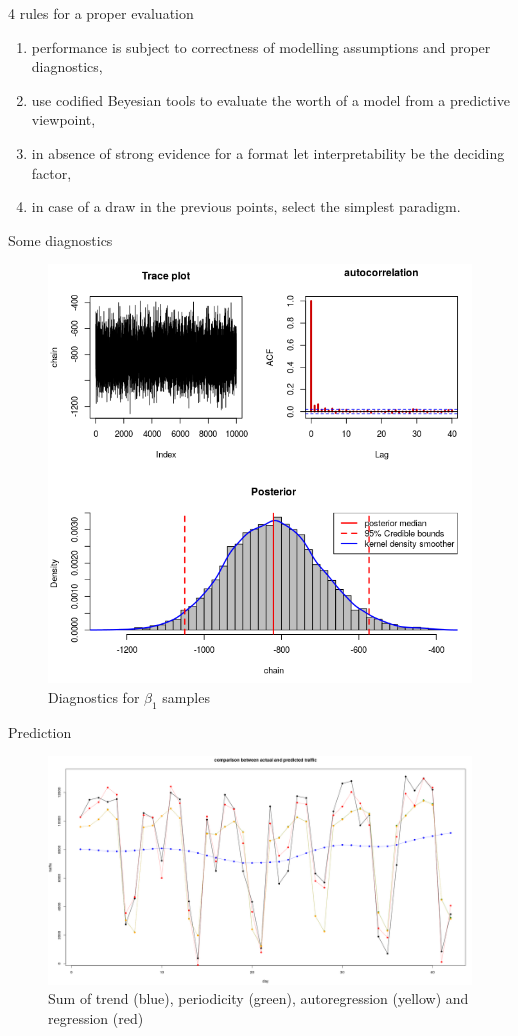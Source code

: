 \documentclass{beamer}
\begin{document}
\begin{frame}{4 rules for a proper evaluation}
\begin{enumerate}
	\item performance is subject to correctness of modelling assumptions and \alert{proper diagnostics},
	\item use codified Beyesian tools to evaluate the worth of a model from a \alert{predictive} viewpoint,
	\item in absence of strong evidence for a format let \alert{interpretability} be the deciding factor,
	\item in case of a draw in the previous points, select the \alert{simplest} paradigm.
\end{enumerate}
\end{frame}

\begin{frame}{Some diagnostics}
\begin{figure}[H]
		\centering
		\includegraphics[width=60 mm]{pictures/beta_1.png}
		\caption{\tiny Diagnostics for $ \beta_1 $ samples}
		\label{fig:beta_1}
\end{figure}
\end{frame}


\begin{frame}{Prediction}
\begin{figure}[H]
	\centering
	\includegraphics[width=100 mm]{pictures/m2_g1.png}
	\caption{Sum of trend (blue), periodicity (green), autoregression (yellow) and regression (red)}
	\label{fig:M2_p1}
\end{figure}
\end{frame}
\end{document}
